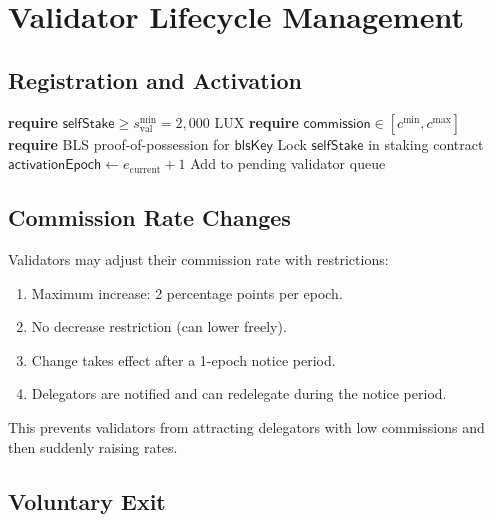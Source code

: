 \section{Validator Lifecycle Management}
\label{sec:lifecycle}

\subsection{Registration and Activation}

\begin{algorithm}[H]
\caption{Validator Registration}
\label{alg:registration}
\begin{algorithmic}[1]
    \State \textbf{require} $\mathsf{selfStake} \geq s^{\min}_{\text{val}} = 2{,}000$ LUX
    \State \textbf{require} $\mathsf{commission} \in [c^{\min}, c^{\max}]$
    \State \textbf{require} BLS proof-of-possession for $\mathsf{blsKey}$
    \State Lock $\mathsf{selfStake}$ in staking contract
    \State $\mathsf{activationEpoch} \gets e_{\text{current}} + 1$
    \State Add to pending validator queue
\EndProcedure
\end{algorithmic}
\end{algorithm}

\subsection{Commission Rate Changes}

Validators may adjust their commission rate with restrictions:

\begin{definition}
\begin{enumerate}
    \item Maximum increase: 2 percentage points per epoch.
    \item No decrease restriction (can lower freely).
    \item Change takes effect after a 1-epoch notice period.
    \item Delegators are notified and can redelegate during the notice period.
\end{enumerate}
\end{definition}

This prevents validators from attracting delegators with low commissions and then suddenly raising rates.

\subsection{Voluntary Exit}


